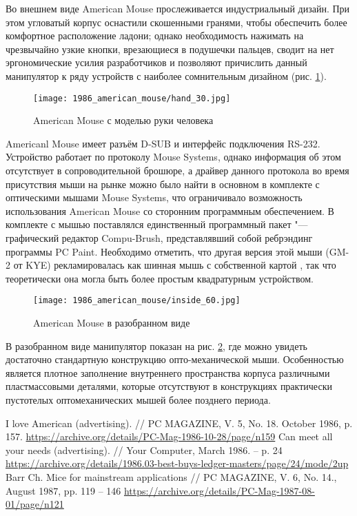 \documentclass[11pt, a4paper]{article}
\begin{document}
Во внешнем виде American Mouse прослеживается индустриальный дизайн. При этом угловатый корпус оснастили скошенными гранями, чтобы обеспечить более комфортное расположение ладони; однако необходимость нажимать на чрезвычайно узкие кнопки, врезающиеся в подушечки пальцев, сводит на нет эргономические усилия разработчиков и позволяют причислить данный манипулятор к ряду устройств с наиболее сомнительным дизайном (рис. \ref{fig:AmericanHand}).

\begin{figure}[h]
    \centering
    \texttt{[image: 1986\_american\_mouse/hand\_30.jpg]}
    \caption{American Mouse с моделью руки человека}
    \label{fig:AmericanHand}
\end{figure}

Americanl Mouse имеет разъём D-SUB и интерфейс подключения RS-232. Устройство работает по протоколу Mouse Systems, однако информация об этом отсутствует в сопроводительной брошюре, а драйвер данного протокола во время присутствия мыши на рынке можно было найти в основном в комплекте с оптическими мышами Mouse Systems, что ограничивало возможность использования American Mouse со сторонним программным обеспечением. В комплекте с мышью поставлялся единственный программный пакет "--- графический редактор Compu-Brush, представлявший собой ребрэндинг программы PC Paint. Необходимо отметить, что другая версия этой мыши (GM-2 от KYE) рекламировалась как шинная мышь с собственной картой \cite{kye}, так что теоретически она могла быть более простым квадратурным устройством.

\begin{figure}[h]
    \centering
    \texttt{[image: 1986\_american\_mouse/inside\_60.jpg]}
    \caption{American Mouse в разобранном виде}
    \label{fig:AmericanInside}
\end{figure}

В разобранном виде манипулятор показан на рис. \ref{fig:AmericanInside}, где можно увидеть достаточно стандартную конструкцию опто-механической мыши. Особенностью является плотное заполнение внутреннего пространства корпуса различными пластмассовыми деталями, которые отсутствуют в конструкциях практически пустотелых оптомеханических мышей более позднего периода.

\begin{thebibliography}{9}
 I love American (advertising). // PC MAGAZINE, V. 5, No. 18. October 1986, p. 157. \url{https://archive.org/details/PC-Mag-1986-10-28/page/n159}
 Can meet all your needs (advertising). // Your Computer, March 1986. -- p. 24 \url{https://archive.org/details/1986.03-best-buys-ledger-masters/page/24/mode/2up}
 Barr Ch. Mice for mainstream applications // PC MAGAZINE, V. 6, No. 14., August 1987, pp. 119 – 146 \url{https://archive.org/details/PC-Mag-1987-08-01/page/n121}
\end{thebibliography}
\end{document}
